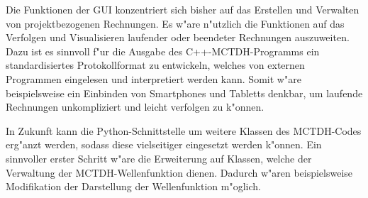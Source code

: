 Die Funktionen der GUI konzentriert sich bisher auf das Erstellen und Verwalten von
projektbezogenen Rechnungen. Es w"are n"utzlich die Funktionen auf das Verfolgen und Visualisieren
laufender oder beendeter Rechnungen auszuweiten. Dazu ist es sinnvoll f"ur die Ausgabe des C++-MCTDH-Programms 
ein standardisiertes Protokollformat zu entwickeln, welches von externen Programmen eingelesen
und interpretiert werden kann. Somit w"are beispielsweise ein Einbinden von Smartphones und Tabletts
denkbar, um laufende Rechnungen unkompliziert und leicht verfolgen zu k"onnen.

In Zukunft kann die Python-Schnittstelle um weitere Klassen des MCTDH-Codes erg"anzt werden, sodass diese
vielseitiger eingesetzt werden k"onnen. Ein sinnvoller erster Schritt w"are die Erweiterung auf Klassen,
welche der Verwaltung der MCTDH-Wellenfunktion dienen. Dadurch w"aren beispielsweise Modifikation der
Darstellung der Wellenfunktion m"oglich.
